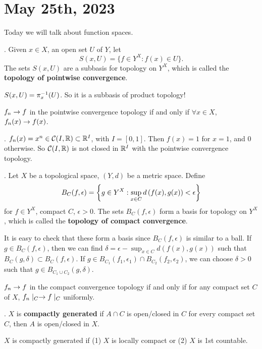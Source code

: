 \section*{May 25th, 2023}

Today we will talk about function spaces.


.  Given \(x \in X\), an open set \(U\) of \(Y\), let
\[
    S(x, U) = \{f \in Y^X : f(x) \in U\}.
\]
The sets \(S(x, U)\) are a subbasis for topology on \(Y^X\), which is called the \textbf{topology of pointwise convergence}.

\rmk \(S(x, U) = \pi_x^{-1}(U)\). So it is a subbasis of product topology!

 \(f_n \rightarrow f\) in the pointwise convergence topology if and only if \(\forall x \in X\), \(f_n(x) \rightarrow f(x)\).

\ex. \(f_n(x) = x^n \in \mathcal{C}(I, \mathbb{R}) \subset \mathbb{R}^I\), with \(I = [0, 1]\). Then \(f(x) = 1\) for \(x = 1\), and \(0\) otherwise. So \(\mathcal{C}(I, \mathbb{R})\) is not closed in \(\mathbb{R}^I\) with the pointwise convergence topology.

.  Let \(X\) be a topological space, \((Y, d)\) be a metric space. Define
\[
    B_C(f, \epsilon) = \left\{g \in Y^X : \sup_{x \in C} d\left( f(x), g(x) \right) < \epsilon\right\}
\]
for \(f \in Y^X\), compact \(C\), \(\epsilon > 0\). The sets \(B_C(f, \epsilon)\) form a basis for topology on \(Y^X\), which is called the \textbf{topology of compact convergence}.

\rmk It is easy to check that these form a basis since \(B_C(f, \epsilon)\) is similar to a ball. If \(g \in B_C(f, \epsilon)\), then we can find \(\delta = \epsilon - \sup_{x \in C} d(f(x), g(x))\) such that \(B_C(g, \delta) \subset B_C(f, \epsilon)\). If \(g \in B_{C_1}(f_1, \epsilon_1) \cap B_{C_2}(f_2, \epsilon_2)\), we can choose \(\delta > 0\) such that \(g \in B_{C_1 \cup C_2}(g, \delta)\).

 \(f_n \rightarrow f\) in the compact convergence topology if and only if for any compact set \(C\) of \(X\), \(f_n \mid_C \rightarrow f \mid_C\) uniformly.

.  \(X\) is \textbf{compactly generated} if \(A\cap C\) is open/closed in \(C\) for every compact set \(C\), then \(A\) is open/closed in \(X\).

 \(X\) is compactly generated if (1) \(X\) is locally compact or (2) \(X\) is 1st countable.

